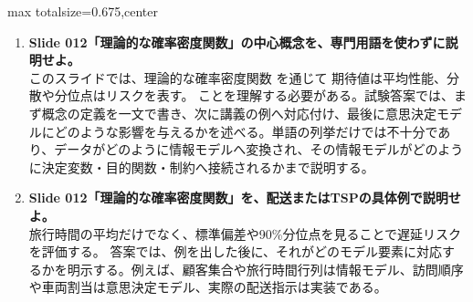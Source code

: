 \begin{adjustbox}{max totalsize={\textwidth}{0.675\textheight},center}
\begin{minipage}{\textwidth}
\begin{minipage}[t]{0.485\textwidth}
\begin{enumerate}
\item \textbf{Slide 012「理論的な確率密度関数」の中心概念を、専門用語を使わずに説明せよ。}\\このスライドでは、理論的な確率密度関数 を通じて 期待値は平均性能、分散や分位点はリスクを表す。 ことを理解する必要がある。試験答案では、まず概念の定義を一文で書き、次に講義の例へ対応付け、最後に意思決定モデルにどのような影響を与えるかを述べる。単語の列挙だけでは不十分であり、データがどのように情報モデルへ変換され、その情報モデルがどのように決定変数・目的関数・制約へ接続されるかまで説明する。
\item \textbf{Slide 012「理論的な確率密度関数」を、配送またはTSPの具体例で説明せよ。}\\旅行時間の平均だけでなく、標準偏差や90\%分位点を見ることで遅延リスクを評価する。 答案では、例を出した後に、それがどのモデル要素に対応するかを明示する。例えば、顧客集合や旅行時間行列は情報モデル、訪問順序や車両割当は意思決定モデル、実際の配送指示は実装である。
\end{enumerate}
\end{minipage}
\end{minipage}
\end{adjustbox}

